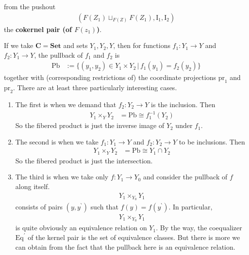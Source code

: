 \begin{exa}
\begin{enumerate}
\begin{enumerate}
from the pushout
\begin{align*}
  \left(
    F(Z_{1})
    \sqcup_{F(Z)}
    F(Z_{1}),
    \mathrm{I}_{1},
    \mathrm{I}_{2}
  \right)
\end{align*}
the \textbf{cokernel pair (of $F(z_{1})$)}.
\end{enumerate}
If we take $\mathbf{C} = \mathbf{Set}$ and sets $Y_{1},Y_{2},Y$, then for functions $f_{1} \colon Y_{1} \rightarrow Y$ and $f_{2} \colon Y_{1} \rightarrow Y$, the pullback of $f_{1}$ and $f_{2}$ is
\begin{align*}
  \mathrm{Pb}
  &:=
  \lbrace
      (y_{1},y_{2})
      \in
      Y_{1}
      \times
      Y_{2}
    \,
    \vert
    \,
      f_{1}(y_{1})
      =
      f_{2}(y_{2})
  \rbrace
\end{align*}
together with (corresponding restrictions of) the coordinate projections $\mathrm{pr}_{1}$ and $\mathrm{pr}_{2}$.
There are at least three particularly interesting cases.
\begin{enumerate}
\item[(a)]
The first is when we demand that $f_{2} \colon Y_{2} \rightarrow Y$ is the inclusion.
Then
\begin{align*}
  Y_{1}
  \times_{Y}
  Y_{2}
  &=
  \mathrm{Pb}
  \cong
  f_{1}^{-1}(Y_{2})
\end{align*}
So the fibered product is just the inverse image of $Y_{2}$ under $f_{1}$.
\item[(b)]
The second is when we take $f_{1} \colon Y_{1} \rightarrow Y$ and $f_{2} \colon Y_{2} \rightarrow Y$ to be inclusions.
Then
\begin{align*}
  Y_{1}
  \times_{Y}
  Y_{2}
  &=
  \mathrm{Pb}
  \cong
  Y_{1}
  \cap
  Y_{2}
\end{align*}
So the fibered product is just the intersection.
\item[(c)]
The third is when we take only $f \colon Y_{1} \rightarrow Y_{0}$ and consider the pullback of $f$ along itself.
\begin{align*}
  Y_{1}
  \times_{Y_{0}}
  Y_{1}
\end{align*}
consists of pairs $(y,y^{\backprime})$ such that $f(y) = f(y^{\backprime})$.
In particular,
\begin{align*}
  Y_{1}
  \times_{Y_{0}}
  Y_{1}
\end{align*}
is quite obviously an equivalence relation on $Y_{1}$.
By the way, the coequalizer $\mathrm{Eq}^{\prime}$ of the kernel pair is the set of equivalence classes.
But there is more we can obtain from the fact that the pullback here is an equivalence relation.

\end{enumerate}
\end{enumerate}
\end{exa}
